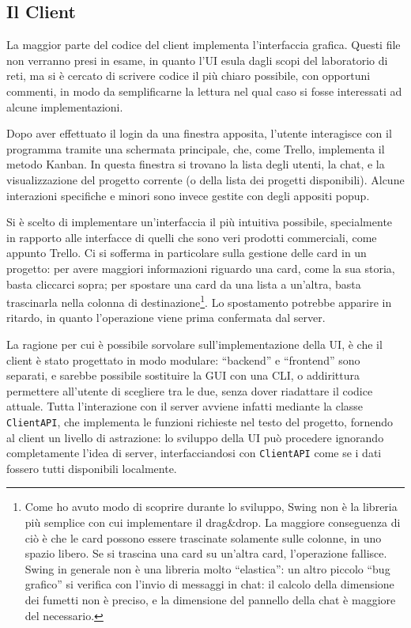 \documentclass[a4paper,11pt] {article}
\begin{document}
\subsection*{Il Client}

La maggior parte del codice del client implementa l'interfaccia grafica. Questi file non verranno presi in esame, in quanto l'UI esula dagli scopi del laboratorio di reti, ma si è cercato di scrivere codice il più chiaro possibile, con opportuni commenti, in modo da semplificarne la lettura nel qual caso si fosse interessati ad alcune implementazioni.

Dopo aver effettuato il login da una finestra apposita, l'utente interagisce con il programma tramite una schermata principale, che, come Trello, implementa il metodo Kanban. In questa finestra si trovano la lista degli utenti, la chat, e la visualizzazione del progetto corrente (o della lista dei progetti disponibili). Alcune interazioni specifiche e minori sono invece gestite con degli appositi popup.

Si è scelto di implementare un'interfaccia il più intuitiva possibile, specialmente in rapporto alle interfacce di quelli che sono veri prodotti commerciali, come appunto Trello. Ci si sofferma in particolare sulla gestione delle card in un progetto: per avere maggiori informazioni riguardo una card, come la sua storia, basta cliccarci sopra; per spostare una card da una lista a un'altra, basta trascinarla nella colonna di destinazione\footnote{Come ho avuto modo di scoprire durante lo sviluppo, Swing non è la libreria più semplice con cui implementare il drag\&drop. La maggiore conseguenza di ciò è che le card possono essere trascinate solamente sulle colonne, in uno spazio libero. Se si trascina una card su un'altra card, l'operazione fallisce.\\Swing in generale non è una libreria molto ``elastica'': un altro piccolo ``bug grafico'' si verifica con l'invio di messaggi in chat: il calcolo della dimensione dei fumetti non è preciso, e la dimensione del pannello della chat è maggiore del necessario.}. Lo spostamento potrebbe apparire in ritardo, in quanto l'operazione viene prima confermata dal server.

La ragione per cui è possibile sorvolare sull'implementazione della UI, è che il client è stato progettato in modo modulare: ``backend'' e ``frontend'' sono separati, e sarebbe possibile sostituire la GUI con una CLI, o addirittura permettere all'utente di scegliere tra le due, senza dover riadattare il codice attuale.
Tutta l'interazione con il server avviene infatti mediante la classe \texttt{ClientAPI}, che implementa le funzioni richieste nel testo del progetto, fornendo al client un livello di astrazione: lo sviluppo della UI può procedere ignorando completamente l'idea di server, interfacciandosi con \texttt{ClientAPI} come se i dati fossero tutti disponibili localmente.
\end{document}
